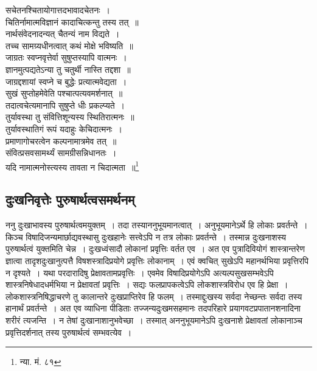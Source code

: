		{\fontsize{11.7}{0}\selectfont\s \begin{center}सचेतनश्चितायोगात्तदभावादचेतनः~।\\ चितिर्नामात्मविज्ञानं कादाचित्कन्तु तस्य तत्~॥\\ नार्थसंवेदनादन्यत् चैतन्यं नाम विद्यते~।\\ तच्च सामग्र्यधीनत्वात् कथं मोक्षे भविष्यति~॥\\ जाग्रतः स्वप्नवृत्तेर्वा सुषुप्तस्यापि वात्मनः~।\\ ज्ञानमुत्पद्यतेऽन्या तु चतुर्थी नास्ति तद्दशा~॥\\ जाग्रद्दशायां स्वप्ने च बुद्धेः प्रत्यात्मवेद्यता~।\\ सुखं सुप्तोहमेवेति पश्चात्पत्यवमर्शनात्~॥\\ तदात्वचेत्यमानापि सुषुप्ते धीः प्रकल्प्यते~।\\ तुर्यावस्था तु संवित्तिशून्यस्य स्थितिरात्मनः~॥\\ तुर्यावस्थातिगं रूपं यदाहुः केचिदात्मनः~।\\ प्रमाणागोचरत्वेन कल्पनामात्रमेव तत्~॥\\ संवित्प्रसवसामर्थ्यं सामग्रीसन्निधानतः~।\\ यदि नामात्मनोस्त्यस्य तावता न चिदात्मता~॥\footnote{न्या. मं. ८१}\end{center}}

		\subsection{दुःखनिवृत्तेः पुरुषार्थत्वसमर्थनम्}

		ननु दुःखाभावस्य पुरुषार्थत्वमयुक्तम्~। तदा तस्याननुभूयमानत्वात्~। अनुभूयमानेऽर्थे हि लोकाः प्रवर्तन्ते~। किञ्च विषादिजन्यमार्छाद्यवस्थासु दुःखहानेः सत्त्वेऽपि न तत्र लोकाः प्रवर्तन्ते~। तस्मान्न दुःखनाशस्य पुरुषार्थत्वं युक्तमिति चेन्न~। दुःखध्वंसादौ लोकानां प्रवृत्तिः वर्तत एव~। अत एव पुत्रादिवियोगं शास्त्रान्तरेण ज्ञात्वा तादृशदुःखानुत्पत्तै विषशस्त्रादिप्रयोगे प्रवृत्तिः लोकानाम्~। एवं क्वचित् सुखेऽपि महानर्थभिया प्रवृत्तिरपि न दृश्यते~। यथा परदारादिषु प्रेक्षावतामप्रवृत्तिः~। एवमेव विषादिप्रयोगेऽपि अत्यल्पसुखसम्भवेऽपि शास्त्रनिषेधादधर्मभिया न प्रेक्षावतां प्रवृत्तिः~। सद्यः फलप्रापकत्वेऽपि लोकशास्त्रविरोध एव हि प्रेक्षा~। लोकशास्त्रनिषिद्धाचरणे तु कालान्तरे दुःखप्राप्तिरेव हि फलम्~। तस्माद्दुःखस्य सर्वदा नेच्छन्तः सर्वदा तस्य हानार्थं प्रवर्तन्ते~। अत एव व्याधिना पीडिताः तज्जन्यदुःखमसहमानः तदपरिहारे प्रयागवटप्रपातानशनादिना शरीरं त्यजन्ति~। न तेषां दुःखानाशानुभवेच्छा~। तस्मात् अननुभूयमानेऽपि दुःखनाशे प्रेक्षावतां लोकानाञ्च प्रवृत्तिदर्शनात् तस्य पुरुषार्थत्वं सम्भवत्येव~।

